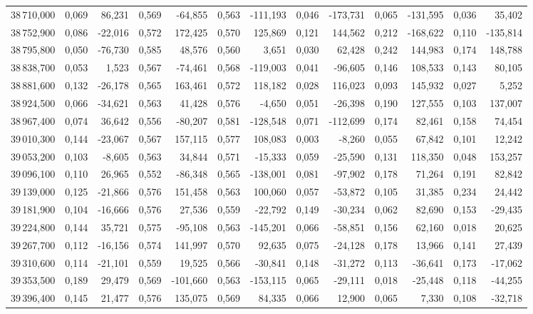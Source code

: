 \begin{longtable}{rrrrrrrrrrrrr}
38\,710,000 & 0,069 & 86,231 & 0,569 & -64,855 & 0,563 & -111,193 & 0,046 & -173,731 & 0,065 & -131,595 & 0,036 & 35,402\\
38\,752,900 & 0,086 & -22,016 & 0,572 & 172,425 & 0,570 & 125,869 & 0,121 & 144,562 & 0,212 & -168,622 & 0,110 & -135,814\\
38\,795,800 & 0,050 & -76,730 & 0,585 & 48,576 & 0,560 & 3,651 & 0,030 & 62,428 & 0,242 & 144,983 & 0,174 & 148,788\\
38\,838,700 & 0,053 & 1,523 & 0,567 & -74,461 & 0,568 & -119,003 & 0,041 & -96,605 & 0,146 & 108,533 & 0,143 & 80,105\\
38\,881,600 & 0,132 & -26,178 & 0,565 & 163,461 & 0,572 & 118,182 & 0,028 & 116,023 & 0,093 & 145,932 & 0,027 & 5,252\\
38\,924,500 & 0,066 & -34,621 & 0,563 & 41,428 & 0,576 & -4,650 & 0,051 & -26,398 & 0,190 & 127,555 & 0,103 & 137,007\\
38\,967,400 & 0,074 & 36,642 & 0,556 & -80,207 & 0,581 & -128,548 & 0,071 & -112,699 & 0,174 & 82,461 & 0,158 & 74,454\\
39\,010,300 & 0,144 & -23,067 & 0,567 & 157,115 & 0,577 & 108,083 & 0,003 & -8,260 & 0,055 & 67,842 & 0,101 & 12,242\\
39\,053,200 & 0,103 & -8,605 & 0,563 & 34,844 & 0,571 & -15,333 & 0,059 & -25,590 & 0,131 & 118,350 & 0,048 & 153,257\\
39\,096,100 & 0,110 & 26,965 & 0,552 & -86,348 & 0,565 & -138,001 & 0,081 & -97,902 & 0,178 & 71,264 & 0,191 & 82,842\\
39\,139,000 & 0,125 & -21,866 & 0,576 & 151,458 & 0,563 & 100,060 & 0,057 & -53,872 & 0,105 & 31,385 & 0,234 & 24,442\\
39\,181,900 & 0,104 & -16,666 & 0,576 & 27,536 & 0,559 & -22,792 & 0,149 & -30,234 & 0,062 & 82,690 & 0,153 & -29,435\\
39\,224,800 & 0,144 & 35,721 & 0,575 & -95,108 & 0,563 & -145,201 & 0,066 & -58,851 & 0,156 & 62,160 & 0,018 & 20,625\\
39\,267,700 & 0,112 & -16,156 & 0,574 & 141,997 & 0,570 & 92,635 & 0,075 & -24,128 & 0,178 & 13,966 & 0,141 & 27,439\\
39\,310,600 & 0,114 & -21,101 & 0,559 & 19,525 & 0,566 & -30,841 & 0,148 & -31,272 & 0,113 & -36,641 & 0,173 & -17,062\\
39\,353,500 & 0,189 & 29,479 & 0,569 & -101,660 & 0,563 & -153,115 & 0,065 & -29,111 & 0,018 & -25,448 & 0,118 & -44,255\\
39\,396,400 & 0,145 & 21,477 & 0,576 & 135,075 & 0,569 & 84,335 & 0,066 & 12,900 & 0,065 & 7,330 & 0,108 & -32,718\\

\end{longtable}
